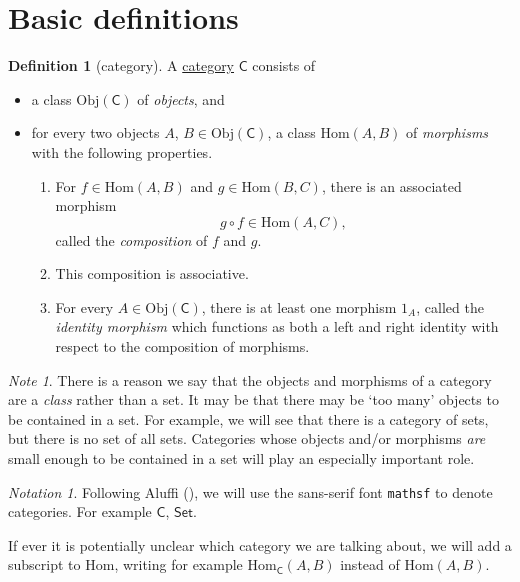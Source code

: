 \documentclass[a4paper]{report}
\newcommand{\defn}[1]{\ul{#1}}
\newcommand{\Obj}{\mathrm{Obj}}
\newcommand{\Hom}{\mathrm{Hom}}
\theoremstyle{definition}
\newtheorem{definition}{Definition}[section]
\theoremstyle{plain}
\theoremstyle{remark}
\newtheorem{note}{Note}[section]
\newtheorem{notation}{Notation}[section]
\begin{document}
\section{Basic definitions} \label{sec:categoriesbasicdefinitions}
\begin{definition}[category] 
  \label{def:category} 
  A \defn{category} $\mathsf{C}$ consists of 
  \begin{itemize} 
    \item a class $\Obj(\mathsf{C})$ of \emph{objects}, and \item for every two objects $A$, $B \in \Obj(\mathsf{C})$, a class $\Hom(A,B)$ of \emph{morphisms} with the following properties.  
      \begin{enumerate} 
        \item \label{item:compositionofmorphisms} For $f \in \Hom(A,B)$ and $g \in \Hom(B,C)$, there is an associated morphism 
          \begin{equation*} 
            g \circ f \in \Hom(A,C), 
          \end{equation*} called the \emph{composition} of $f$ and $g$.

        \item This composition is associative.

        \item \label{item:existenceofidentitymorphism} For every $A \in \Obj(\mathsf{C})$, there is at least one morphism $1_{A}$, called the \emph{identity morphism} which functions as both a left and right identity with respect to the composition of morphisms.

      \end{enumerate} 
  \end{itemize} 
\end{definition}

\begin{note}
  There is a reason we say that the objects and morphisms of a category are a \emph{class} rather than a set. It may be that there may be `too many' objects to be contained in a set. For example, we will see that there is a category of sets, but there is no set of all sets. Categories whose objects and/or morphisms \emph{are} small enough to be contained in a set will play an especially important role.
\end{note}

\begin{notation}
  Following Aluffi (\cite{aluffi-algebra-chapter-0}), we will use the sans-serif font \texttt{mathsf} to denote categories. For example $\mathsf{C}$, $\mathsf{Set}$.

  If ever it is potentially unclear which category we are talking about, we will add a subscript to $\Hom$, writing for example $\Hom_{\mathsf{C}}(A,B)$ instead of $\Hom(A,B)$.
\end{notation}
\end{document}
